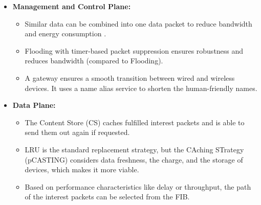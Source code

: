 \documentclass[a0paper,portrait]{baposter}
\begin{document}
\begin{poster}
{\begin{itemize}[leftmargin=5.5mm, rightmargin=5.5mm]
		\item \textbf{Management and Control Plane:}
		\begin{itemize}[leftmargin=5.5mm, rightmargin=5.5mm]
		\item Similar data can be combined into one data packet to reduce bandwidth and energy consumption \cite{b3}.
		\item Flooding with timer-based packet suppression ensures robustness and reduces bandwidth (compared to Flooding).
		\item A gateway ensures a smooth transition between wired and wireless devices. It uses a name alias service to shorten the human-friendly names.
		\end{itemize}


		\item \textbf{Data Plane:}
		\begin{itemize}[leftmargin=5.5mm, rightmargin=5.5mm]
		\item The Content Store (CS) caches fulfilled interest packets and is able to send them out again if requested.
		\item LRU is the standard replacement strategy, but the CAching STrategy (pCASTING) considers data freshness, the charge, and the storage of devices, which makes it more viable.
		\item Based on performance characteristics like delay or throughput, the path of the interest packets can be selected from the FIB.
		\end{itemize}


	\end{itemize}
		\vspace{0.5em}
}




\end{poster}
\end{document}
